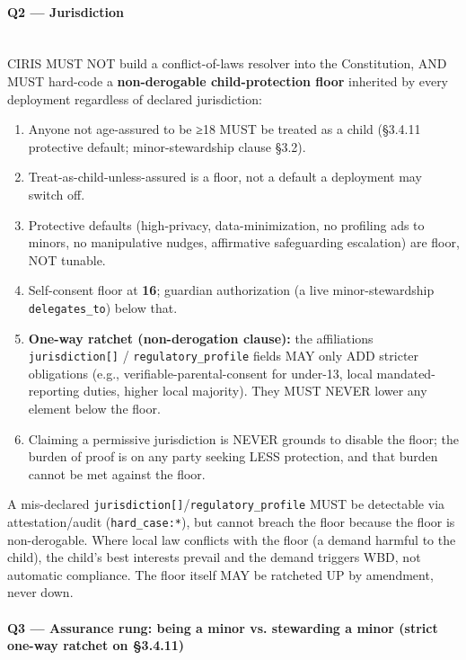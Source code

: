 \documentclass[11pt]{article}
\begin{document}
\paragraph{Q2 — Jurisdiction}\mbox{}\\


CIRIS MUST NOT build a conflict-of-laws resolver into the Constitution, AND MUST hard-code a \textbf{non-derogable child-protection floor} inherited by every deployment regardless of declared jurisdiction:


\begin{enumerate}\setlength\itemsep{0pt}
\item Anyone not age-assured to be ≥18 MUST be treated as a child (§3.4.11 protective default; minor-stewardship clause §3.2).
\item Treat-as-child-unless-assured is a floor, not a default a deployment may switch off.
\item Protective defaults (high-privacy, data-minimization, no profiling ads to minors, no manipulative nudges, affirmative safeguarding escalation) are floor, NOT tunable.
\item Self-consent floor at \textbf{16}; guardian authorization (a live minor-stewardship \texttt{delegates\_to}) below that.
\item \textbf{One-way ratchet (non-derogation clause):} the affiliations \texttt{jurisdiction[]} / \texttt{regulatory\_profile} fields MAY only ADD stricter obligations (e.g., verifiable-parental-consent for under-13, local mandated-reporting duties, higher local majority). They MUST NEVER lower any element below the floor.
\item Claiming a permissive jurisdiction is NEVER grounds to disable the floor; the burden of proof is on any party seeking LESS protection, and that burden cannot be met against the floor.
\end{enumerate}


A mis-declared \texttt{jurisdiction[]}/\texttt{regulatory\_profile} MUST be detectable via attestation/audit (\texttt{hard\_case:*}), but cannot breach the floor because the floor is non-derogable. Where local law conflicts with the floor (a demand harmful to the child), the child's best interests prevail and the demand triggers WBD, not automatic compliance. The floor itself MAY be ratcheted UP by amendment, never down.


\paragraph{Q3 — Assurance rung: being a minor vs. stewarding a minor (strict one-way ratchet on §3.4.11)}\mbox{}\\
\end{document}
